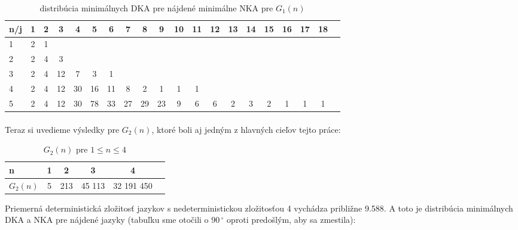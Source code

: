 \begin{table}[h]
  \centering
  \begin{tabular}{|l|c|c|c|c|c|c|c|c|c|c|c|c|c|c|c|c|c|c|r|}
    \hline
    n/j & 1 & 2 & 3 & 4 & 5 & 6 & 7 & 8 & 9 & 10 & 11 & 12 & 13 & 14 & 15 & 16 & 17 & 18 \\ 
    \hline
    1 & 2 & 1 & & & & & & & & & & & & & & & &\\ 
    \hline
    2 & 2 & 4 & 3 & & & & & & & & & & & & & & &\\
    \hline
    3 & 2 & 4 & 12 & 7 & 3 & 1 & & & & & & & & & & & &\\
    \hline
    4 & 2 & 4 & 12 & 30 & 16 & 11 & 8 & 2 & 1 & 1 & 1 & & & & & & &\\
    \hline
    5 & 2 & 4 & 12 & 30 & 78 & 33 & 27 & 29 & 23 & 9 & 6 & 6 & 2 & 3 & 2 & 1 & 1 & 1 \\
    \hline
  \end{tabular}
  \caption{distribúcia minimálnych DKA pre nájdené minimálne NKA pre $G_1(n)$}
  \label{tab:G1n}
\end{table}

\paragraph{}
Teraz si uvedieme výsledky pre $G_2(n)$, ktoré boli aj jedným z hlavných cieľov tejto práce:

\begin{table}[h]
  \centering
  \begin{tabular}{|l|c|c|c|c|r|}
    \hline
    n & 1 & 2 & 3 & 4 \\ 
    \hline
    $G_2(n)$ & 5 & 213 & 45 113 & 32 191 450 \\ 
    \hline
  \end{tabular}
  \caption{$G_2(n)$ pre $1 \leq n \leq 4$}
\end{table}

Priemerná deterministická zložitosť jazykov s nedeterministickou zložitosťou 4 vychádza približne 9.588. A toto je distribúcia minimálnych DKA a NKA pre nájdené jazyky (tabuľku sme otočili o $90\,^{\circ}$ oproti predošlým, aby sa zmestila):

